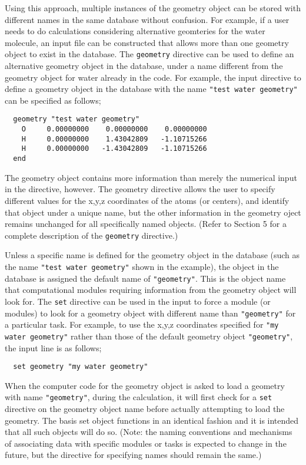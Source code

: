 Using this approach, multiple instances of the geometry object can be 
stored with different names in the same database without confusion.  
For example, if a user needs to do calculations considering alternative
geomteries for the water molecule, an input file can be constructed that
allows more than one geometry object to exist in the database.  The
{\tt geometry} directive can be used to define an alternative geometry
object in the database, under a name different from the geometry object
for water already in the code.  For example, the input directive to define
a geometry object in the database with the name
\verb+"test water geometry"+ can be specified as follows;

\begin{verbatim}
  geometry "test water geometry"
    O     0.00000000    0.00000000    0.00000000
    H     0.00000000    1.43042809   -1.10715266
    H     0.00000000   -1.43042809   -1.10715266
  end
\end{verbatim}

The geometry object contains more information than merely
the numerical input in the directive, however.  The geometry directive
allows the user to specify different values for the x,y,z coordinates of
the atoms (or centers), and identify that object under a unique name, but 
the other information in the geometry oject remains unchanged for all
specifically named objects.  (Refer to Section 5 for a complete description of the {\tt geometry}
directive.)  

Unless a specific name is defined for the geometry object in the database
(such as the name  \verb+"test water geometry"+ shown in the example), 
the object in the database is 
assigned the default name of \verb+"geometry"+.  This is the object name
that computational modules requiring information from the geometry object
will look for.  The {\tt set} directive can be used in the input to force a
module (or modules) to look for a geometry object with 
different name than \verb+"geometry"+ for a particular task.  For example, 
to use the x,y,z coordinates specified for \verb+"my water geometry"+ 
rather than those of the default geometry object \verb+"geometry"+, the
input line is as follows;

\begin{verbatim}
  set geometry "my water geometry"
\end{verbatim}

When the computer code for the geometry object is asked to load a geometry
with name \verb+"geometry"+, during the calculation, it will first check for 
a {\tt set} directive on the geometry object name before actually attempting 
to load the geometry.  The basis set object
functions in an identical fashion and it is intended that all such
objects will do so.  (Note: the naming conventions and mechanisms of 
associating data with specific modules or tasks is expected to change in
the future, but the directive for specifying names should remain the same.)

